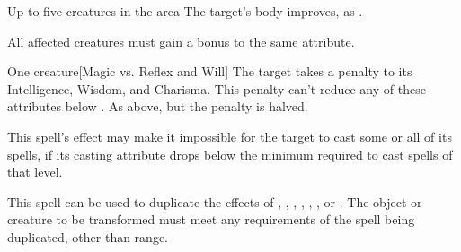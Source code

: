 \begin{spellheader}
\end{spellheader}
\begin{spelleffects}
    \begin{spelltargets}{Up to five creatures in the area}
        \spelleffect The target's body improves, as . 
    \end{spelltargets}
\end{spelleffects}
\begin{spellfooter}
    \spellnotes All affected creatures must gain a bonus to the same attribute.
\end{spellfooter}

\begin{spellheader}
    \spelldur{\durshort}
\end{spellheader}
\begin{spelleffects}
    \begin{spelltarget}{One creature}[Magic vs. Reflex and Will]
        \spellsuccess[Reflex] The target takes a  penalty to its Intelligence, Wisdom, and Charisma. This penalty can't reduce any of these attributes below .
        \spellfailure[Will] As above, but the penalty is halved.
    \end{spelltarget}
\end{spelleffects}
\begin{spellfooter}
    \spellnotes This spell's effect may make it impossible for the target to cast some or all of its spells, if its casting attribute drops below the minimum required to cast spells of that level.
\end{spellfooter}

\begin{spellheader}
    \spellrng{\rngmed}
\end{spellheader}
\begin{spelleffects}
    \spellspecial This spell can be used to duplicate the effects of , , , , , , or . The object or creature to be transformed must meet any requirements of the spell being duplicated, other than range.
\end{spelleffects}
\begin{spellfooter}
    
\end{spellfooter}

